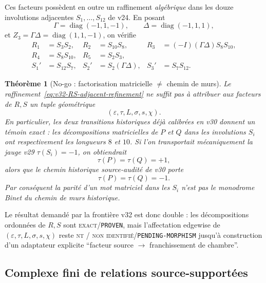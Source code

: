 \documentclass[11pt,a4paper]{article}
\newtheorem{theorem}{Théorème}[section]
\newcommand{\statusExact}{\textsc{exact}}
\newcommand{\statusNT}{\textsc{nt / non identifié}}
\newcommand{\certProven}{\texttt{PROVEN}}
\newcommand{\certPending}{\texttt{PENDING-MORPHISM}}
\begin{document}
Ces facteurs possèdent en outre un raffinement \emph{algébrique} dans les douze involutions
adjacentes $S_1,\ldots,S_{12}$ de v24. En posant
\[
 \Gamma=\operatorname{diag}(-1,1,-1),\qquad
 \Delta=\operatorname{diag}(-1,1,1),
\]
et $Z_3=\Gamma\Delta=\operatorname{diag}(1,1,-1)$, on vérifie
\begin{equation}\label{eq:v32-RS-adjacent-refinement}
\begin{aligned}
 R_1&=S_3S_2,&
 R_2&=S_{10}S_8,&
 R_3&=(-I)(\Gamma\Delta)S_8S_{10},\\
 R_4&=S_8S_{10},&
 R_5&=S_2S_3,\\[1mm]
 S_1'&=S_{12}S_7,&
 S_2'&=S_2(\Gamma\Delta),&
 S_3'&=S_7S_{12}.
\end{aligned}
\end{equation}

\begin{theorem}[No-go : factorisation matricielle $\neq$ chemin de murs]\label{thm:v32-matrix-word-wall-nogo}
Le raffinement~\eqref{eq:v32-RS-adjacent-refinement} ne suffit pas à attribuer aux facteurs de
$R,S$ un tuple géométrique
\[
 (\varepsilon,\tau,L,\sigma,s,\chi).
\]
En particulier, les deux transitions historiques déjà calibrées en v30 donnent un témoin exact :
les décompositions matricielles de $P$ et $Q$ dans les involutions $S_i$ ont respectivement les
longueurs $8$ et $10$. Si l'on transportait mécaniquement la jauge v29 $\tau(S_i)=-1$, on obtiendrait
\[
 \tau(P)=\tau(Q)=+1,
\]
alors que le chemin historique source-audité de v30 porte
\[
 \tau(P)=\tau(Q)=-1.
\]
Par conséquent la parité d'un mot matriciel dans les $S_i$ n'est pas le monodrome Binet du chemin
de murs historique.
\end{theorem}

Le résultat demandé par la frontière v32 est donc double : les décompositions ordonnées de
$R,S$ sont \statusExact{}/\certProven{}, mais l'affectation edgewise de
$(\varepsilon,\tau,L,\sigma,s,\chi)$ reste \statusNT{}/\certPending{} jusqu'à construction d'un
adaptateur explicite ``facteur source $\to$ franchissement de chambre''.

\subsection{Complexe fini de relations source-supportées}
\end{document}
